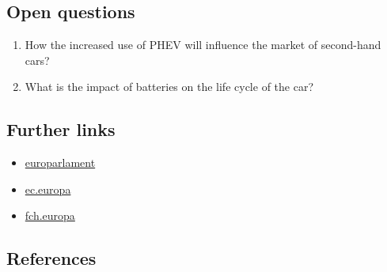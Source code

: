 \documentclass[
]{book}
\providecommand{\tightlist}{%
  \setlength{\itemsep}{0pt}\setlength{\parskip}{0pt}}
\begin{document}
\hypertarget{open-questions-48}{%
\subsection*{Open questions}\label{open-questions-48}}

\begin{enumerate}
\def\labelenumi{\arabic{enumi}.}
\tightlist
\item
  How the increased use of PHEV will influence the market of second-hand cars?
\item
  What is the impact of batteries on the life cycle of the car?
\end{enumerate}

\hypertarget{further-links-40}{%
\subsection*{Further links}\label{further-links-40}}

\begin{itemize}
\tightlist
\item
  \href{https://www.europarl.europa.eu/news/nl/press-room/20180911IPR13114/more-electric-cars-on-eu-roads-by-2030}{europarlament}
\item
  \href{https://ec.europa.eu/transport/themes/urban/vehicles/road/hydrogen_en}{ec.europa}
\item
  \href{https://www.fch.europa.eu/news/hydrogen-roadmap-europe-sustainable-pathway-european-energy-transition}{fch.europa}
\end{itemize}

\hypertarget{references-48}{%
\subsection*{References}\label{references-48}}
\end{document}
